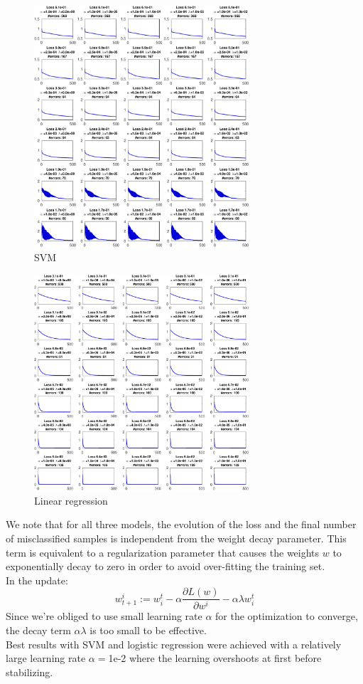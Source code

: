 \documentclass{acmsiggraph}
\newcommand{\1}{\mathbbm{1}}
\begin{document}
\begin{figure}[H]
\centering
\includegraphics[width=8cm]{svm}
\caption{SVM}
\end{figure}

\begin{figure}[H]
\centering
\includegraphics[width=8cm]{lr}
\caption{Linear regression}
\end{figure}
We note that for all three models, the evolution of the loss and the final number of misclassified samples is independent from the weight decay parameter. This term is equivalent to a regularization parameter that causes the weights $w$ to exponentially decay to zero in order to avoid over-fitting the training set.\\
In the update:
\[w^i_{t+1} := w_i^t -\alpha \frac{\partial L(w)}{\partial w^i} - \alpha\lambda w_i^t\]
Since we're obliged to use small learning rate $\alpha$ for the optimization to converge, the decay term $\alpha\lambda$ is too small to be effective.\\
Best results with SVM and logistic regression were achieved with a relatively large learning rate $\alpha=$1e-2 where the learning overshoots at first before stabilizing.
\end{document}
